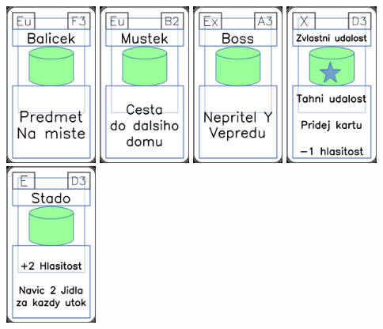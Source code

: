 \documentclass[a4paper]{article}
\begin{document}
	\includegraphics[width=3.0cm]{img-4_27}
	\includegraphics[width=3.0cm]{img-4_36}
	\includegraphics[width=3.0cm]{img-4_2}
	\includegraphics[width=3.0cm]{img-5_17}
	\includegraphics[width=3.0cm]{img-4_47}
\end{document}
